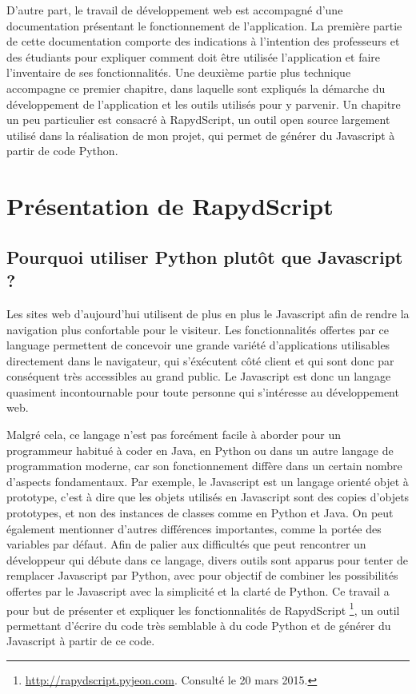 \documentclass[a4paper,11pt,openany,oneside]{sphinxmanual}
\begin{document}
D'autre part, le travail de développement web est accompagné
d'une documentation présentant le fonctionnement de l'application. La première partie de
cette documentation
comporte des indications à l'intention des professeurs et des étudiants pour expliquer
comment doit être utilisée l'application et faire l'inventaire de ses fonctionnalités.
Une deuxième partie plus technique accompagne ce premier chapitre, dans laquelle sont expliqués
la démarche du développement de l'application et les outils utilisés pour y parvenir. Un chapitre
un peu particulier
est consacré à RapydScript, un outil open source largement utilisé dans la réalisation
de mon projet, qui permet de générer du Javascript à partir de code Python.


\chapter{Présentation de RapydScript}
\label{rapydscript::doc}\label{rapydscript:presentation-de-rapydscript}

\section{Pourquoi utiliser Python plutôt que Javascript ?}
\label{rapydscript:pourquoi-utiliser-python-plutot-que-javascript}
Les sites web d'aujourd'hui utilisent de plus en plus le Javascript afin de rendre la navigation plus confortable pour le visiteur. Les fonctionnalités offertes par ce language permettent de concevoir une grande variété d'applications utilisables directement dans le navigateur, qui s'éxécutent côté client et qui sont donc par conséquent très accessibles au grand public. Le Javascript est donc un langage quasiment incontournable pour toute personne qui s'intéresse au développement web.

Malgré cela, ce langage n'est pas forcément facile à aborder pour un programmeur habitué à coder en Java, en Python ou dans un autre langage de programmation moderne, car son fonctionnement diffère dans un certain nombre d'aspects fondamentaux. Par exemple, le Javascript est un langage orienté objet à prototype, c'est à dire que les objets utilisés en Javascript sont des copies d'objets prototypes, et non des instances de classes comme en Python et Java. On peut également mentionner d'autres différences importantes, comme la portée des variables par défaut. Afin de palier aux difficultés que peut rencontrer un développeur qui débute dans ce langage, divers outils sont apparus pour tenter de remplacer Javascript par Python, avec pour objectif de combiner les possibilités offertes par le Javascript avec la simplicité et la clarté de Python. Ce travail a pour but de présenter et expliquer les fonctionnalités de RapydScript \footnote{
\href{http://rapydscript.pyjeon.com}{http://rapydscript.pyjeon.com}. Consulté le 20 mars 2015.
}, un outil permettant d'écrire du code très semblable à du code Python et de générer du Javascript à partir de ce code.
\end{document}
